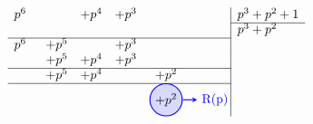     \begin{center}
\renewcommand{\arraystretch}{1.5}
$
\begin{array}{r r r r c r | l}
    p^6 & \hspace{8mm} & + p^4 & + p^3 & \hspace{8mm} & \hspace{8mm} & p^3 + p^2 + 1 \\ 
    \cline{7-7}
        &        &       &       &       &       & p^3 + p^2 \\ 
    \cline{1-6}
    p^6 & + p^5  &       & + p^3 &       &       & \\ 
        & + p^5  & + p^4 & + p^3 &       &       & \\ 
    \cline{1-6}
        & + p^5  & + p^4 &       & + p^2 &       & \\ 
    \cline{1-6}
        &        &       &       & 
            \begin{tikzpicture}[baseline=(R.base)]
                \node[draw=blue, fill=blue!15, circle, inner sep=2pt, thick] (R) {$+ p^2$};
                \draw[blue, thick, ->, >=stealth, overlay] (R.east) -- ++(0.4,0) node[right] {R(p)};
            \end{tikzpicture}
        & & 
\end{array}
$
\end{center}